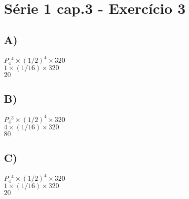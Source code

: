 \section*{Série 1 cap.3 - Exercício 3}
    
    \subsection*{A)}
    $P{_4}^4 \times (1/2)^4 \times 320$ \\
    $ 1 \times (1/16) \times 320$ \\
    $20$ \\
    
    \subsection*{B)}
    $P{_4}^3 \times (1/2)^4 \times 320$ \\
    $ 4 \times (1/16) \times 320$ \\
    $80$ \\
    
    \subsection*{C)}
    $P{_4}^4 \times (1/2)^4 \times 320$ \\
    $ 1 \times (1/16) \times 320$ \\
    $20$ \\

